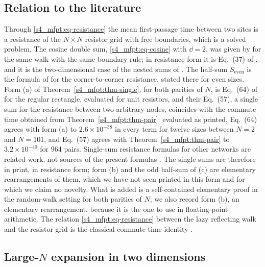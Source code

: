 \subsection{Relation to the literature}\label{s4_mfpt:ssec-lit}

Through \eqref{s4_mfpt:eq-resistance} the mean first-passage time between two sites is a resistance of the $N\times N$
resistor grid with free boundaries, which is a solved problem. The cosine double sum, \eqref{s4_mfpt:eq-cosine} with
$\dd=2$, was given by \citet{CondaminBenichou2006} for the same walk with the same boundary rule; in resistance form it
is Eq.~(37) of \citet{Wu2004}, and it is the two-dimensional case of the nested sums of \citet{Giuggioli2020}. The
half-sum $S_{\mathrm{even}}$ is the formula of \citet{EssamWu2009} for the corner-to-corner resistance, stated there for
even sizes. Form (a) of Theorem~\ref{s4_mfpt:thm-single}, for both parities of $N$, is Eq.~(64) of \citet{TanTan2020}
for the regular rectangle, evaluated for unit resistors, and their Eq.~(57), a single sum for the resistance between
two arbitrary nodes, coincides with the commute time obtained from Theorem~\ref{s4_mfpt:thm-pair}: evaluated as
printed, Eq.~(64) agrees with form (a) to $2.6\times10^{-38}$ in every term for twelve sizes between $N=2$ and
$N=101$, and Eq.~(57) agrees with Theorem~\ref{s4_mfpt:thm-pair} to $3.2\times10^{-40}$ for 964 pairs.
Single-sum resistance formulas for other networks are related work, not sources of the present formulas
\citep{IzmailianKennaWu2014,Tan2015,Essam2015}. The single sums are therefore in print, in resistance form; form (b)
and the odd half-sum of (c) are elementary rearrangements of them, which we have not seen printed in this form and
for which we claim no novelty. What is added is a self-contained elementary proof in the random-walk setting for both
parities of $N$; we also record form (b), an elementary rearrangement, because it is the one to use in floating-point
arithmetic. The relation
\eqref{s4_mfpt:eq-resistance} between the lazy reflecting walk and the resistor grid is the classical commute-time
identity \citep{Chandra1989,Tetali1991}.

\subsection{Large-\texorpdfstring{$N$}{N} expansion in two dimensions}\label{s4_mfpt:ssec-expansion}

